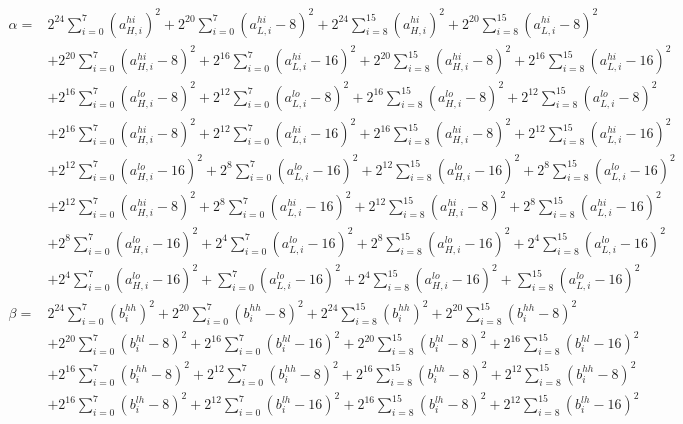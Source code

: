 \documentclass[fleqn]{article}
\begin{document}
{\[{\begin{aligned}
\alpha ={}& 2^{24}\!\sum_{i=0}^{7}(a_{H,i}^{hi})^2 + 2^{20}\!\sum_{i=0}^{7}(a_{L,i}^{hi}{-}8)^2 + 2^{24}\!\sum_{i=8}^{15}(a_{H,i}^{hi})^2 + 2^{20}\!\sum_{i=8}^{15}(a_{L,i}^{hi}{-}8)^2 \\
  & + 2^{20}\!\sum_{i=0}^{7}(a_{H,i}^{hi}{-}8)^2 + 2^{16}\!\sum_{i=0}^{7}(a_{L,i}^{hi}{-}16)^2 + 2^{20}\!\sum_{i=8}^{15}(a_{H,i}^{hi}{-}8)^2 + 2^{16}\!\sum_{i=8}^{15}(a_{L,i}^{hi}{-}16)^2 \\
  & + 2^{16}\!\sum_{i=0}^{7}(a_{H,i}^{lo}{-}8)^2 + 2^{12}\!\sum_{i=0}^{7}(a_{L,i}^{lo}{-}8)^2 + 2^{16}\!\sum_{i=8}^{15}(a_{H,i}^{lo}{-}8)^2 + 2^{12}\!\sum_{i=8}^{15}(a_{L,i}^{lo}{-}8)^2 \\
  & + 2^{16}\!\sum_{i=0}^{7}(a_{H,i}^{hi}{-}8)^2 + 2^{12}\!\sum_{i=0}^{7}(a_{L,i}^{hi}{-}16)^2 + 2^{16}\!\sum_{i=8}^{15}(a_{H,i}^{hi}{-}8)^2 + 2^{12}\!\sum_{i=8}^{15}(a_{L,i}^{hi}{-}16)^2 \\
  & + 2^{12}\!\sum_{i=0}^{7}(a_{H,i}^{lo}{-}16)^2 + 2^{8}\!\sum_{i=0}^{7}(a_{L,i}^{lo}{-}16)^2 + 2^{12}\!\sum_{i=8}^{15}(a_{H,i}^{lo}{-}16)^2 + 2^{8}\!\sum_{i=8}^{15}(a_{L,i}^{lo}{-}16)^2 \\
  & + 2^{12}\!\sum_{i=0}^{7}(a_{H,i}^{hi}{-}8)^2 + 2^{8}\!\sum_{i=0}^{7}(a_{L,i}^{hi}{-}16)^2 + 2^{12}\!\sum_{i=8}^{15}(a_{H,i}^{hi}{-}8)^2 + 2^{8}\!\sum_{i=8}^{15}(a_{L,i}^{hi}{-}16)^2 \\
  & + 2^{8}\!\sum_{i=0}^{7}(a_{H,i}^{lo}{-}16)^2 + 2^{4}\!\sum_{i=0}^{7}(a_{L,i}^{lo}{-}16)^2 + 2^{8}\!\sum_{i=8}^{15}(a_{H,i}^{lo}{-}16)^2 + 2^{4}\!\sum_{i=8}^{15}(a_{L,i}^{lo}{-}16)^2 \\
  & + 2^{4}\!\sum_{i=0}^{7}(a_{H,i}^{lo}{-}16)^2 + \sum_{i=0}^{7}(a_{L,i}^{lo}{-}16)^2 + 2^{4}\!\sum_{i=8}^{15}(a_{H,i}^{lo}{-}16)^2 + \sum_{i=8}^{15}(a_{L,i}^{lo}{-}16)^2 \\[0.35em]
\beta ={}& 2^{24}\!\sum_{i=0}^{7}(b_i^{hh})^2 + 2^{20}\!\sum_{i=0}^{7}(b_i^{hh}{-}8)^2 + 2^{24}\!\sum_{i=8}^{15}(b_i^{hh})^2 + 2^{20}\!\sum_{i=8}^{15}(b_i^{hh}{-}8)^2 \\
  & + 2^{20}\!\sum_{i=0}^{7}(b_i^{hl}{-}8)^2 + 2^{16}\!\sum_{i=0}^{7}(b_i^{hl}{-}16)^2 + 2^{20}\!\sum_{i=8}^{15}(b_i^{hl}{-}8)^2 + 2^{16}\!\sum_{i=8}^{15}(b_i^{hl}{-}16)^2 \\
  & + 2^{16}\!\sum_{i=0}^{7}(b_i^{hh}{-}8)^2 + 2^{12}\!\sum_{i=0}^{7}(b_i^{hh}{-}8)^2 + 2^{16}\!\sum_{i=8}^{15}(b_i^{hh}{-}8)^2 + 2^{12}\!\sum_{i=8}^{15}(b_i^{hh}{-}8)^2 \\
  & + 2^{16}\!\sum_{i=0}^{7}(b_i^{lh}{-}8)^2 + 2^{12}\!\sum_{i=0}^{7}(b_i^{lh}{-}16)^2 + 2^{16}\!\sum_{i=8}^{15}(b_i^{lh}{-}8)^2 + 2^{12}\!\sum_{i=8}^{15}(b_i^{lh}{-}16)^2 \\

\end{aligned}}\]}
\end{document}
